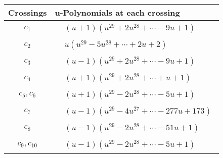 \documentclass[1p]{elsarticle_modified}
\theoremstyle{definition}
\begin{document}
\begin{tabular}{m{50pt}|m{274pt}}
Crossings & \hspace{64pt}u-Polynomials at each crossing \\
\hline $$\begin{aligned}c_{1}\end{aligned}$$&$\begin{aligned}
&(u+1)(u^{29}+2 u^{28}+\cdots-9 u+1)
\end{aligned}$\\
\hline $$\begin{aligned}c_{2}\end{aligned}$$&$\begin{aligned}
&u(u^{29}-5 u^{28}+\cdots+2 u+2)
\end{aligned}$\\
\hline $$\begin{aligned}c_{3}\end{aligned}$$&$\begin{aligned}
&(u-1)(u^{29}+2 u^{28}+\cdots-9 u+1)
\end{aligned}$\\
\hline $$\begin{aligned}c_{4}\end{aligned}$$&$\begin{aligned}
&(u+1)(u^{29}+2 u^{28}+\cdots+u+1)
\end{aligned}$\\
\hline $$\begin{aligned}c_{5},c_{6}\end{aligned}$$&$\begin{aligned}
&(u+1)(u^{29}-2 u^{28}+\cdots-5 u+1)
\end{aligned}$\\
\hline $$\begin{aligned}c_{7}\end{aligned}$$&$\begin{aligned}
&(u-1)(u^{29}-4 u^{27}+\cdots-277 u+173)
\end{aligned}$\\
\hline $$\begin{aligned}c_{8}\end{aligned}$$&$\begin{aligned}
&(u-1)(u^{29}-2 u^{28}+\cdots-51 u+1)
\end{aligned}$\\
\hline $$\begin{aligned}c_{9},c_{10}\end{aligned}$$&$\begin{aligned}
&(u-1)(u^{29}-2 u^{28}+\cdots-5 u+1)
\end{aligned}$\\
\hline
\end{tabular}\newpage\renewcommand{\arraystretch}{1}
\end{document}
